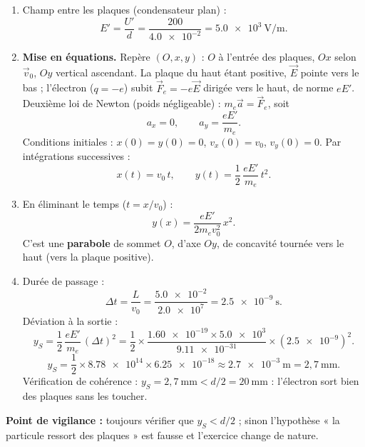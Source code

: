 \documentclass[11pt]{article}
\begin{document}
\begin{corrige}
\begin{enumerate}
\item Champ entre les plaques (condensateur plan) :
\[
E' = \frac{U'}{d} = \frac{200}{\num{4,0e-2}} = \num{5,0e3}~\mathrm{V/m}.
\]
\item \textbf{Mise en équations.} Repère $(O,x,y)$ : $O$ à l'entrée des plaques, $Ox$ selon $\vec{v}_0$, $Oy$ vertical ascendant. La plaque du haut étant positive, $\vec{E}$ pointe vers le bas ; l'électron ($q=-e$) subit $\vec{F}_e = -e\vec{E}$ dirigée vers le haut, de norme $eE'$. Deuxième loi de Newton (poids négligeable) : $m_e\vec{a} = \vec{F}_e$, soit
\[
a_x = 0, \qquad a_y = \frac{eE'}{m_e}.
\]
Conditions initiales : $x(0)=y(0)=0$, $v_x(0)=v_0$, $v_y(0)=0$. Par intégrations successives :
\[
\boxed{x(t) = v_0\,t}, \qquad \boxed{y(t) = \frac{1}{2}\,\frac{eE'}{m_e}\,t^2}.
\]
\item En éliminant le temps ($t = x/v_0$) :
\[
y(x) = \frac{eE'}{2m_e v_0^2}\,x^2.
\]
C'est une \textbf{parabole} de sommet $O$, d'axe $Oy$, de concavité tournée vers le haut (vers la plaque positive).
\item Durée de passage :
\[
\Delta t = \frac{L}{v_0} = \frac{\num{5,0e-2}}{\num{2,0e7}} = \num{2,5e-9}~\mathrm{s}.
\]
Déviation à la sortie :
\[
y_S = \frac{1}{2}\,\frac{eE'}{m_e}\,(\Delta t)^2 = \frac{1}{2}\times\frac{\num{1,60e-19}\times\num{5,0e3}}{\num{9,11e-31}}\times(\num{2,5e-9})^2.
\]
\[
y_S = \frac{1}{2}\times\num{8,78e14}\times\num{6,25e-18} \approx \num{2,7e-3}~\mathrm{m} = 2,7~\mathrm{mm}.
\]
Vérification de cohérence : $y_S = 2,7~\mathrm{mm} < d/2 = 20~\mathrm{mm}$ : l'électron sort bien des plaques sans les toucher.
\end{enumerate}
\textbf{Point de vigilance :} toujours vérifier que $y_S < d/2$ ; sinon l'hypothèse « la particule ressort des plaques » est fausse et l'exercice change de nature.
\end{corrige}
\end{document}
